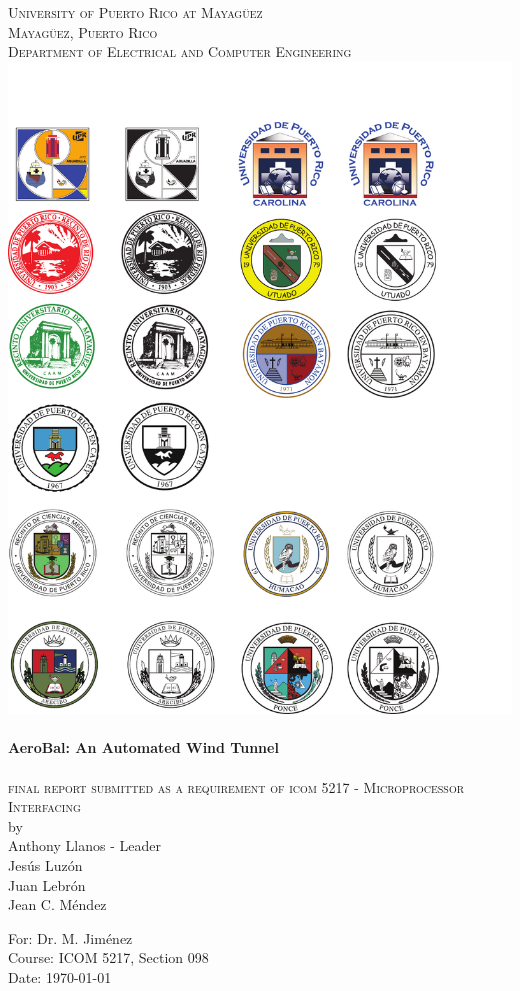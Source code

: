 \begin{titlepage}

\begin{center}


    

\textsc{\large University of Puerto Rico at Mayag\"{u}ez}\\[0.5cm]
\textsc{\large Mayag\"{u}ez, Puerto Rico}\\[0.5cm]
\textsc{\normalsize Department of Electrical and Computer Engineering}\\[1.5cm]
\includegraphics[scale=1.25]{res/logo_rum}\\[1cm]


\HRule \\[0.5cm]
{ \huge \bfseries AeroBal: An Automated Wind Tunnel}\\[0.2cm]
\HRule \\[0.5cm]
\textsc{final report submitted as a requirement of icom 5217 - Microprocessor Interfacing}\\[0.5cm]

by \\[0.5cm]

Anthony Llanos - Leader \\
Jes\'{u}s Luz\'{o}n \\
Juan Lebr\'{o}n \\
Jean C. M\'{e}ndez  \\

\vfill

For: Dr. M. Jim\'{e}nez \\
Course: ICOM 5217, Section 098 \\
Date: \today

\end{center}

\end{titlepage}
